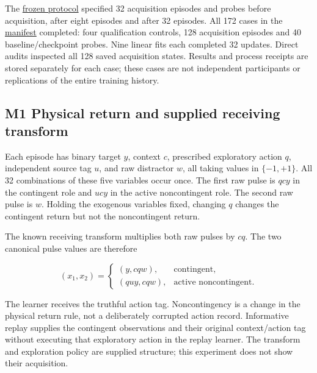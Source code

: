 \documentclass[
  american,
  11pt,
  letterpaper,
]{article}
\begin{document}
The \href{https://github.com/v5ma/v5ma.github.io/blob/master/papers/companions/learning-to-feel-v1.0/ARTIFACT-AVAILABILITY.md#artifact-38}{frozen protocol} specified 32 acquisition episodes and probes before acquisition, after eight episodes and after 32 episodes. All 172 cases in the \href{https://github.com/v5ma/v5ma.github.io/blob/master/papers/companions/learning-to-feel-v1.0/ARTIFACT-AVAILABILITY.md#artifact-37}{manifest} completed: four qualification controls, 128 acquisition episodes and 40 baseline/checkpoint probes. Nine linear fits each completed 32 updates. Direct audits inspected all 128 saved acquisition states. Results and process receipts are stored separately for each case; these cases are not independent participants or replications of the entire training history.

\subsection{M1 Physical return and supplied receiving transform}\label{m1-physical-return-and-supplied-receiving-transform}

Each episode has binary target \(y\), context \(c\), prescribed exploratory action \(q\), independent source tag \(u\), and raw distractor \(w\), all taking values in \(\{-1,+1\}\). All 32 combinations of these five variables occur once. The first raw pulse is \(qcy\) in the contingent role and \(ucy\) in the active noncontingent role. The second raw pulse is \(w\). Holding the exogenous variables fixed, changing \(q\) changes the contingent return but not the noncontingent return.

The known receiving transform multiplies both raw pulses by \(cq\). The two canonical pulse values are therefore

\begin{equation}
(x_1,x_2)=
\begin{cases}
(y,cqw), & \text{contingent},\\
(quy,cqw), & \text{active noncontingent}.
\end{cases}
\tag{M1}
\end{equation}

The learner receives the truthful action tag. Noncontingency is a change in the physical return rule, not a deliberately corrupted action record. Informative replay supplies the contingent observations and their original context/action tag without executing that exploratory action in the replay learner. The transform and exploration policy are supplied structure; this experiment does not show their acquisition.
\end{document}
